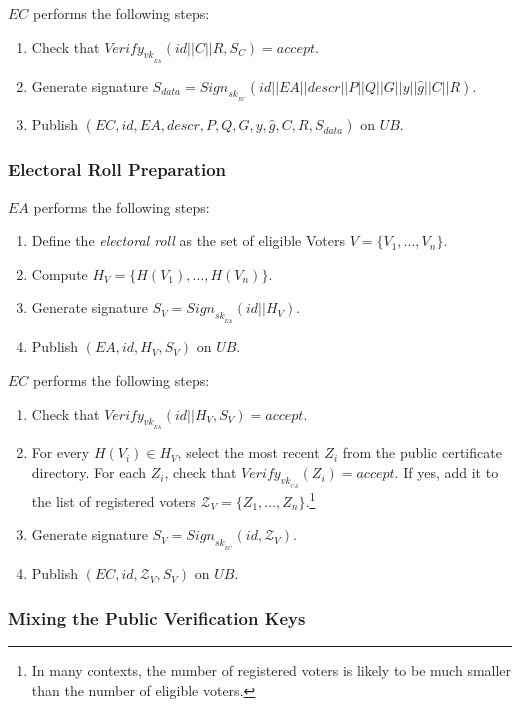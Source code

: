 \documentclass[bibtotoc,halfparskip,oneside]{scrreprt}
\newcommand{\eid}{\mathit{id}\xspace}
\newcommand{\descr}{\mathit{descr}\xspace}
\newcommand{\sk}[1]{\mathit{sk}_{#1}\xspace}
\newcommand{\vk}[1]{\mathit{vk}_{#1}\xspace}
\newcommand{\SK}[1]{\sk{_#1}\xspace}
\newcommand{\VK}[1]{\vk{_#1}\xspace}
\newcommand{\CA}{\ensuremath{\mathit{CA}}\xspace}
\newcommand{\EA}{\ensuremath{\mathit{EA}}\xspace}
\newcommand{\EC}{\ensuremath{\mathit{EC}}\xspace}
\newcommand{\UB}{\ensuremath{\mathit{UB}}\xspace}
\newcommand{\Voter}[1]{\ensuremath{\mathit{V}_{#1}}\xspace}
\begin{document}
\EC performs the following steps:
\begin{enumerate}
	\item Check that $\mathit{Verify}_{\VK{\EA}}(\eid||C||R,S_C)=\mathit{accept}$.
	\item Generate signature $S_{data}=\mathit{Sign}_{\SK{\EC}}(\eid||\EA||\descr||P||Q||G||y||\hat{g}||C||R)$.
	\item Publish $(\EC,\eid,\EA,\descr,P,Q,G,y,\hat{g},C,R,S_{data})$ on \UB.
\end{enumerate}

\subsubsection{Electoral Roll Preparation}

\EA performs the following steps:
\begin{enumerate}
	\item Define the \emph{electoral roll} as the set of eligible Voters $V=\{\Voter{1},\ldots,\Voter{n}\}$.
	\item Compute $H_V=\{H(\Voter{1}),\ldots,H(\Voter{n})\}$.
	\item Generate signature $S_{V}=\mathit{Sign}_{\SK{\EA}}(\eid||H_V)$.
	\item Publish $(\EA,\eid,H_V,S_{V})$ on \UB.
\end{enumerate}

\EC performs the following steps:
\begin{enumerate}[resume]
	\item Check that $\mathit{Verify}_{\VK{\EA}}(\eid||H_V,S_{V})=\mathit{accept}$.
	\item For every $H(\Voter{i})\in H_V$, select the most recent $Z_i$ from the public certificate directory. For each $Z_i$, check that $\mathit{Verify}_{\VK{\CA}}(Z_i)=\mathit{accept}$. If yes, add it to the list of registered voters $\mathcal{Z}_V=\{Z_1,\ldots,Z_n\}$.\footnote{In many contexts, the number of registered voters is likely to be much smaller than the number of eligible voters.}
	\item Generate signature $S_V=\mathit{Sign}_{\SK{\EC}}(\eid,\mathcal{Z}_V)$.
	\item Publish $(\EC,\eid,\mathcal{Z}_V,S_V)$ on \UB.
\end{enumerate}


\subsubsection{Mixing the Public Verification Keys}
\end{document}
